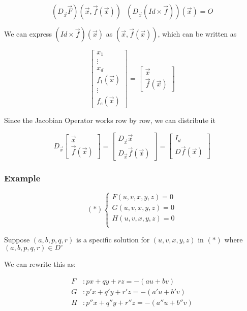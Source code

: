 \documentclass [12 pt, twoside] {book}
\newcommand\+{\text{ }}
\begin{document}
$$(D_{\vec{x}} \vec{F})(\vec{x}, \vec{f}(\vec{x})) \+ (D_{\vec{x}}(Id \times
\vec{f})) (\vec{x}) = O$$

We can express $(Id \times \vec{f})(\vec{x})$ as $(\vec{x}, \vec{f}(\vec{x}))$,
which can be written as

$$\left[\begin{array}{c}
        x_1 \\
        \vdots \\
        x_d \\
        f_1 (\vec{x})\\
        \vdots \\
        f_e (\vec{x})
\end{array}\right] =
\left[\begin{array}{c}
        \vec{x}\\
        \vec{f}(\vec{x})
\end{array}\right]$$

Since the Jacobian Operator works row by row, we can distribute it

$$D_{\vec{x}} \left[\begin{array}{c}
        \vec{x}\\
        \vec{f}(\vec{x})
\end{array}\right] =
\left[\begin{array}{c}
        D_{\vec{x}} \vec{x} \\
        D_{\vec{x}} \vec{f}(\vec{x})
\end{array}\right] =
\left[\begin{array}{c}
        I_d \\
        D \vec{f}(\vec{x})
\end{array}\right]$$

\subsubsection{Example}
\[(*)
\begin{cases}
    F(u, v, x, y, z) = 0 \\
    G(u, v, x, y, z) = 0 \\
    H(u, v, x, y, z) = 0 \\
\end{cases}
\]

Suppose $(a, b, p, q, r)$ is a specific solution for $(u, v, x, y, z)$ in $(*)$
where $(a, b, p, q, r) \in D^\circ$

We can rewrite this as:

\begin{align*}
    F&: px + qy + rz = -(au + bv) \\
    G&: p'x + q'y + r'z = -(a'u + b'v) \\
    H&: p''x + q''y + r''z = -(a''u + b''v)
\end{align*}
\end{document}
